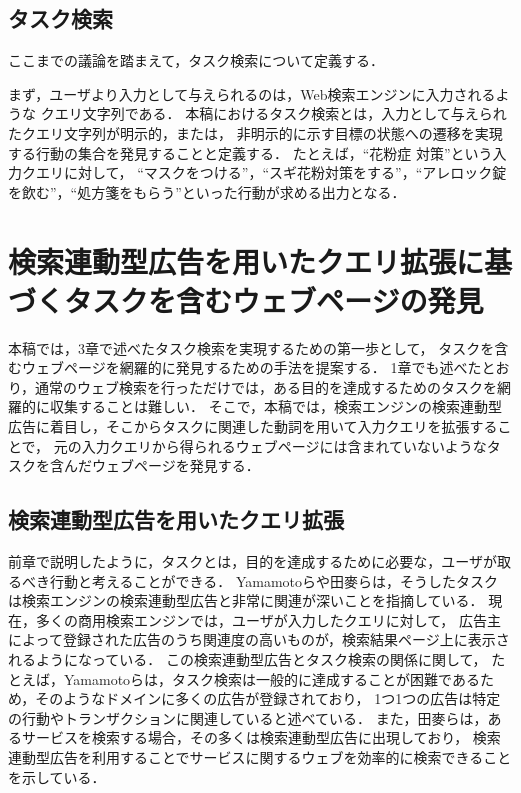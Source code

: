 \documentclass[submit,techreq]{ipsj}
\begin{document}
%



\subsection{タスク検索}
ここまでの議論を踏まえて，タスク検索について定義する．

まず，ユーザより入力として与えられるのは，Web検索エンジンに入力されるような
クエリ文字列である．
本稿におけるタスク検索とは，入力として与えられたクエリ文字列が明示的，または，
非明示的に示す目標の状態への遷移を実現する行動の集合を発見することと定義する．
たとえば，``花粉症  対策''という入力クエリに対して，
``マスクをつける''，``スギ花粉対策をする''，``アレロック錠を飲む''，``処方箋をもらう''といった行動が求める出力となる．



\section{検索連動型広告を用いたクエリ拡張に基づくタスクを含むウェブページの発見}
\label{sec:method}
本稿では，3章で述べたタスク検索を実現するための第一歩として，
タスクを含むウェブページを網羅的に発見するための手法を提案する．
1章でも述べたとおり，通常のウェブ検索を行っただけでは，ある目的を達成するためのタスクを網羅的に収集することは難しい．
そこで，本稿では，検索エンジンの検索連動型広告に着目し，そこからタスクに関連した動詞を用いて入力クエリを拡張することで，
元の入力クエリから得られるウェブページには含まれていないようなタスクを含んだウェブページを発見する．


\subsection{検索連動型広告を用いたクエリ拡張}
前章で説明したように，タスクとは，目的を達成するために必要な，ユーザが取るべき行動と考えることができる．
Yamamotoらや田麥らは，そうしたタスクは検索エンジンの検索連動型広告と非常に関連が深いことを指摘している．
現在，多くの商用検索エンジンでは，ユーザが入力したクエリに対して，
広告主によって登録された広告のうち関連度の高いものが，検索結果ページ上に表示されるようになっている．
この検索連動型広告とタスク検索の関係に関して，
たとえば，Yamamotoらは，タスク検索は一般的に達成することが困難であるため，そのようなドメインに多くの広告が登録されており，
1つ1つの広告は特定の行動やトランザクションに関連していると述べている\cite{yamamoto2012wisdom}．
また，田麥らは，あるサービスを検索する場合，その多くは検索連動型広告に出現しており，
検索連動型広告を利用することでサービスに関するウェブを効率的に検索できることを示している\cite{tamugiDEIM}．
\end{document}

